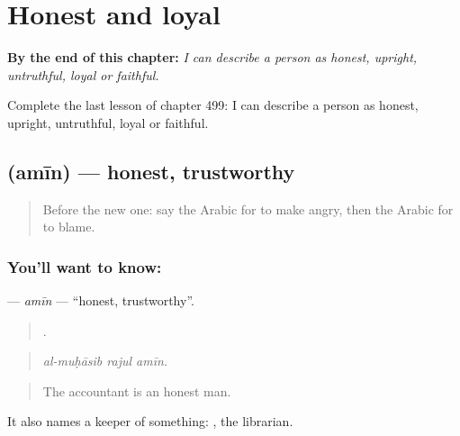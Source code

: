 
\chapter{Honest and loyal}
\label{ch:ar-honest-and-loyal}

\begin{chapteropening}
\textbf{By the end of this chapter:} \emph{I can describe a person as honest, upright, untruthful, loyal or faithful.}

Complete the last lesson of chapter 499: I can describe a person as honest, upright, untruthful, loyal or faithful.
\end{chapteropening}

\section[\texorpdfstring{\ar{أمين} (amīn)}{أمين (amīn)}]{ (amīn) — honest, trustworthy}

\label{lesson:AR-C499-amin}



\begin{quote}
Before the new one: say the Arabic for to make angry, then the Arabic for to blame.
\end{quote}

\subsection*{You'll want to know: }
\textbf{} — \emph{amīn} — \textquotedblleft{}honest, trustworthy\textquotedblright{}.

\begin{quote}
  .
\end{quote}

\begin{quote}
\emph{al-muḥāsib rajul amīn.}
\end{quote}

\begin{quote}
The accountant is an honest man.
\end{quote}

It also names a keeper of something:  , the librarian.

